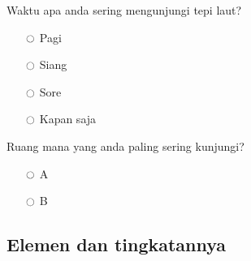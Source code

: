 Waktu apa anda sering mengunjungi tepi laut?
\begin{multicols}{3}
\begin{itemize}
\item[$\ocircle$] Pagi
\item[$\ocircle$] Siang
\item[$\ocircle$] Sore
\item[$\ocircle$] Kapan saja
\end{itemize}
\end{multicols}

Ruang mana yang anda paling sering kunjungi?
\begin{multicols}{2}
\begin{itemize}
\item[$\ocircle$] A
\item[$\ocircle$] B
\end{itemize}
\end{multicols}


\subsection*{Elemen dan tingkatannya}

